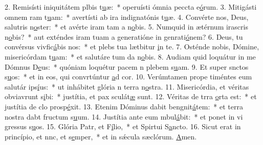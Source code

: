 2. Remisísti iniquitátem plbis t\uline{u}æ:~* operuísti ómnia peccta e\uline{ó}rum.
3. Mitigásti omnem ram t\uline{u}am:~* avertísti ab ira indignatónis t\uline{u}æ.
4. Convérte nos, Deus, salutris n\uline{o}ster:~* et avérte iram tam a n\uline{o}bis.
5. Numquid in ætérnum irascris n\uline{o}bis?~* aut exténdes iram tuam a generatióne in genrati\uline{ó}nem?
6. Deus, tu convérsus vivfic\uline{á}bis nos:~* et plebs tua lætbitur \uline{i}n te.
7. Osténde nobis, Dómine, misericórdam t\uline{u}am:~* et salutáre tum da n\uline{o}bis.
8. Audiam quid loquátur in me Dómnus D\uline{e}us:~* quóniam loquétur pacem n plebem s\uline{u}am.
9. Et super snctos s\uline{u}os:~* et in eos, qui convrtúntur \uline{a}d cor.
10. Verúmtamen prope timéntes eum salutár ips\uline{í}us:~* ut inhábitet glória n terra n\uline{o}stra.
11. Misericórdia, et véritas obviavrunt s\uline{i}bi:~* justítia, et pax sculát\uline{æ} sunt.
12. Véritas de trra \uline{o}rta est:~* et justítia de clo prosp\uline{é}xit.
13. Etenim Dóminus dabit bengnit\uline{á}tem:~* et terra nostra dabt fructum s\uline{u}um.
14. Justítia ante eum mbul\uline{á}bit:~* et ponet in vi gressus s\uline{u}os.
15. Glória Patr, et F\uline{í}lio,~* et Spirtui S\uline{a}ncto.
16. Sicut erat in princípio, et nnc, et s\uline{e}mper,~* et in sǽcula sæclórum. \uline{A}men.
